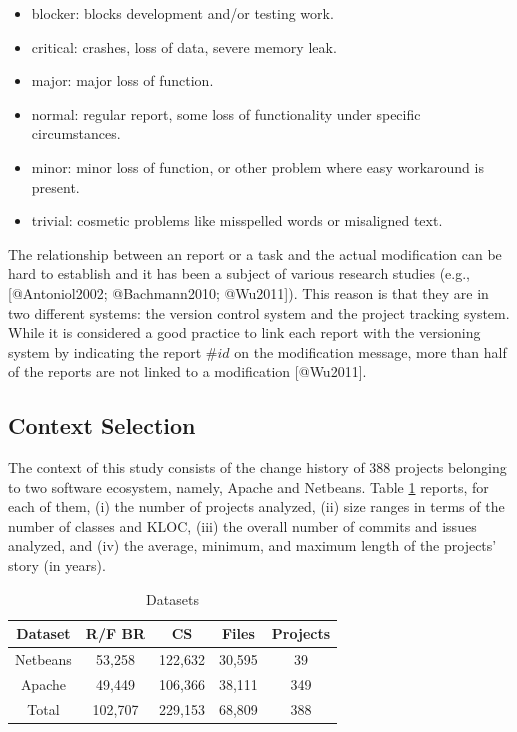 \begin{itemize}
\tightlist
\item
  blocker: blocks development and/or testing work.
\item
  critical: crashes, loss of data, severe memory leak.
\item
  major: major loss of function.
\item
  normal: regular report, some loss of functionality under specific
  circumstances.
\item
  minor: minor loss of function, or other problem where easy workaround
  is present.
\item
  trivial: cosmetic problems like misspelled words or misaligned text.
\end{itemize}

The relationship between an report or a task and the actual modification
can be hard to establish and it has been a subject of various research
studies (e.g., {[}@Antoniol2002; @Bachmann2010; @Wu2011{]}). This reason
is that they are in two different systems: the version control system
and the project tracking system. While it is considered a good practice
to link each report with the versioning system by indicating the report
\(\#id\) on the modification message, more than half of the reports are
not linked to a modification {[}@Wu2011{]}.

\subsection{Context Selection}\label{context-selection}

The context of this study consists of the change history of 388 projects
belonging to two software ecosystem, namely, Apache and Netbeans. Table
\ref{table:datasets} reports, for each of them, (i) the number of
projects analyzed, (ii) size ranges in terms of the number of classes
and KLOC, (iii) the overall number of commits and issues analyzed, and
(iv) the average, minimum, and maximum length of the projects' story (in
years).

\begin{table}[h]
\begin{center}
\begin{tabular}{@{}c|c|c|c|c@{}}
\textbf{Dataset} & \textbf{R/F BR} & \textbf{CS} & \textbf{Files} & \textbf{Projects} \\ \hline \hline
Netbeans         & 53,258          & 122,632     & 30,595         & 39                \\
Apache           & 49,449          & 106,366     & 38,111         & 349               \\
Total            & 102,707         & 229,153     & 68,809         & 388               \\ \hline \hline

\end{tabular}
\end{center}

\caption{Datasets\label{table:datasets}}
\end{table}

